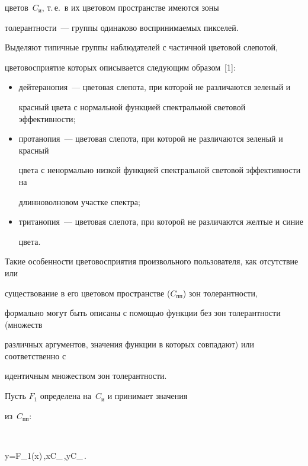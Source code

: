 цветов~$C_{\mathrm{и}}$, т.\,е.\ в их цветовом пространстве имеются зоны


толерантности~--- группы одинаково воспринимаемых пикселей.





Выделяют типичные группы наблюдателей с частичной цветовой слепотой,


цветовосприятие которых описывается сле\-ду\-ющим образом~[1]:


\begin{itemize}


\item дейтеранопия~--- цветовая слепота, при которой не различаются зеленый и


красный цвета с нормальной функцией спектральной световой эффективности;


\item протанопия~--- цветовая слепота, при которой не различаются зеленый и красный


цвета с ненормально низкой функцией спектральной световой эффективности на


длинноволновом участке спектра;


\item тританопия~--- цветовая слепота, при которой не различаются желтые и синие


цвета.


\end{itemize}





Такие особенности цветовосприятия произвольного пользователя, как отсутствие или


существование в его цветовом пространстве ($C_{\mathrm{пп}}$) зон толерантности,


формально могут быть описаны с помощью функции без зон толерантности (множеств\linebreak


различных аргументов, значения функции в которых совпадают) или соответственно с


идентичным множеством зон то\-ле\-рант\-ности.





Пусть $F_1$ определена на~$C_{\mathrm{и}}$ и принимает значения


из~$C_{\mathrm{пп}}$:


$$


y=F_1(x)\,,\quad x\in C_{}\,,\enskip  y\in C_{}\,.


